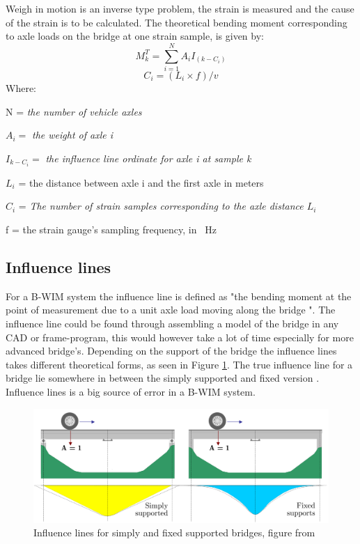 Weigh in motion is an inverse type problem, the strain is measured and the cause of the strain is to be calculated. The theoretical bending moment corresponding to axle loads on the bridge at one strain sample, is given by:
\begin{equation}
M_k^T = \sum_{i = 1}^{N} A_i I_{(k-C_i)}
\end{equation}
\begin{equation}
C_i = (L_i \times f)/v
\end{equation}
Where:
\begin{description}
	\item N = \textit{the number of vehicle axles}
	\item $A_i = $ \textit{the weight of axle i}
	\item $I_{k-C_i} = $ \textit{the influence line ordinate for axle i at sample k}
	\item $L_i$ = the distance between axle i and the first axle in meters	
	\item $C_i$  = \textit{The number of strain samples corresponding to the axle distance $L_i$}
	\item f = the strain gauge's sampling frequency, in \SI{}{\Hz}
	
\end{description}
\subsection{Influence lines}
For a B-WIM system the influence line is defined as "the bending moment at the point of measurement due to a unit axle load moving along the bridge \cite{bwim_an_overview}". The influence line could be found through assembling a model of the bridge in any CAD or frame-program, this would however take a lot of time especially for more advanced bridge's. Depending on the support of the bridge the influence lines takes different theoretical forms, as seen in Figure \ref{fig:theoreticalInfl}. The true influence line for a bridge lie somewhere in between the simply supported and fixed version \cite[p.~146]{bwim_an_overview}. 
Influence lines is a big source of error in a B-WIM system.
\begin{figure}[h]
\centering
\includegraphics[scale=0.5]{figures/inflLinesQuilligan}
\caption{Influence lines for simply and fixed supported bridges, figure from \cite{Quilligan}}
\label{fig:theoreticalInfl} 
\end{figure}  

